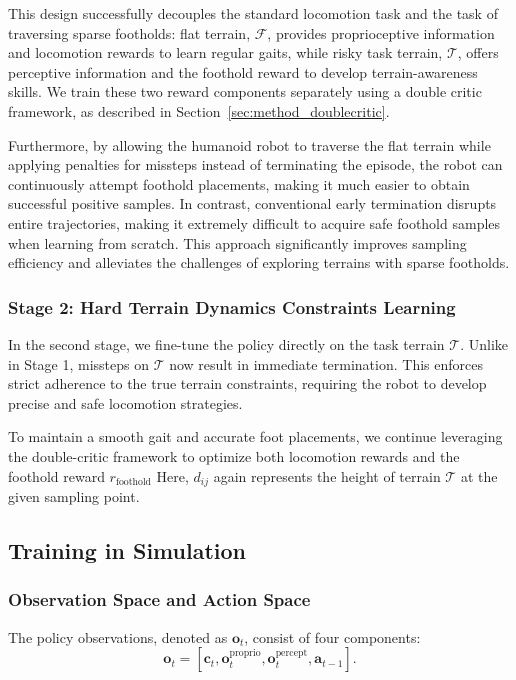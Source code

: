This design successfully decouples the standard locomotion task and the task of traversing sparse footholds: flat terrain, $\mathcal{F}$, provides proprioceptive information and locomotion rewards to learn regular gaits, while risky task terrain, $\mathcal{T}$, offers perceptive information and the foothold reward to develop terrain-awareness skills. We train these two reward components separately using a double critic framework, as described in Section~\ref{sec:method_doublecritic}. 

Furthermore, by allowing the humanoid robot to traverse the flat terrain while applying penalties for missteps instead of terminating the episode, the robot can continuously attempt foothold placements, making it much easier to obtain successful positive samples. In contrast, conventional early termination disrupts entire trajectories, making it extremely difficult to acquire safe foothold samples when learning from scratch. This approach significantly improves sampling efficiency and alleviates the challenges of exploring terrains with sparse footholds.


\subsubsection{Stage 2: Hard Terrain Dynamics Constraints Learning}

In the second stage, we fine-tune the policy directly on the task terrain $\mathcal{T}$. Unlike in Stage 1, missteps on $\mathcal{T}$ now result in immediate termination. This enforces strict adherence to the true terrain constraints, requiring the robot to develop precise and safe locomotion strategies.

To maintain a smooth gait and accurate foot placements, we continue leveraging the double-critic framework to optimize both locomotion rewards and the foothold reward $r_\text{foothold}$ Here, $d_{ij}$ again represents the height of terrain $\mathcal{T}$ at the given sampling point.

\subsection{Training in Simulation}
\subsubsection{Observation Space and Action Space}

The policy observations, denoted as $\mathbf{o}_t$, consist of four components:
\begin{equation} 
    \mathbf{o}_t = \left[\mathbf{c}_t, \mathbf{o}^\text{proprio}_t, \mathbf{o}_t^\text{percept}, \mathbf{a}_{t-1} \right]. 
\end{equation}


